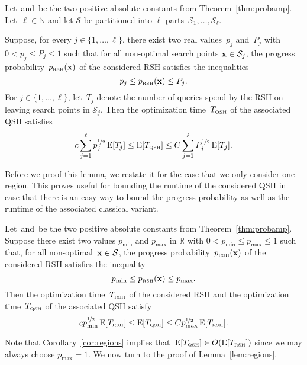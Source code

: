 \documentclass[a4paper,11pt]{article}
\begin{document}
\begin{lemma}
\label{lem:regions}
Let~\lb and~\ub be the two positive absolute constants from Theorem~\ref{thm:probamp}. Let~$\ell\in\mathbb{N}$ and let $\mathcal{S}$ be partitioned into $\ell$ parts~$\mathcal{S}_1, \dots, \mathcal{S}_\ell$.

Suppose, for every $j\in\{1,\dots,\ell\}$, there exist two real values~$p_j$ and~$P_j$ with $0<p_j\le P_j\le 1$ such that for all non-optimal search points $\xvec\in\mathcal{S}_j$, the progress probability~$p_\RSH(\xvec)$ of the considered RSH satisfies the inequalities
\[
p_j\le p_\RSH(\xvec)\le P_j.
\]
For $j\in\{1,\dots,\ell\}$, let~$T_j$ denote the number of queries spend by the RSH on leaving search points in $\mathcal{S}_j$. Then the optimization time~$T_{\text{\tiny\rm QSH}}$ of the associated QSH satisfies
\[
c\sum_{j=1}^\ell p_j^{\nicefrac{1}{2}}\operatorname{E}[T_j]\le \operatorname{E}[T_{\text{\tiny\rm QSH}}] \le C\sum_{j=1}^\ell P_j^{\nicefrac{1}{2}}\operatorname{E}[T_j].
\]
\end{lemma}

Before we proof this lemma, we restate it for the case that we only consider one region. This proves useful for bounding the runtime of the considered QSH in case that there is an easy way to bound the progress probability as well as the runtime of the associated classical variant.

\begin{corollary}
\label{cor:regions}
Let~\lb and~\ub be the two positive absolute constants from Theorem~\ref{thm:probamp}. Suppose there exist two values $p_{\min}$ and $p_{\max}$ in $\mathbb{R}$ with $0<p_{\min}\le p_{\max}\le 1$ such that, for all non-optimal~$\xvec\in\mathcal{S}$, the progress probability~$p_\RSH(\xvec)$ of the considered RSH satisfies the inequality
\[
p_{\min}\le p_\RSH(\xvec)\le p_{\max}. 
\]
Then the optimization time~$T_{\text{\tiny\rm RSH}}$ of the considered RSH and the optimization time~$T_{\text{\tiny\rm QSH}}$ of the associated QSH satisfy
\[
c p_{\min}^{\nicefrac{1}{2}}\operatorname{E}[T_{\text{\tiny\rm RSH}}]\le \operatorname{E}[T_{\text{\tiny\rm QSH}}] \le C p_{\max}^{\nicefrac{1}{2}}\operatorname{E}[T_{\text{\tiny\rm RSH}}].
\]
\end{corollary}

Note that Corollary~\ref{cor:regions} implies that~$\operatorname{E}[T_{\text{\tiny\rm QSH}}]\in{O}(\operatorname{E}[T_{\text{\tiny\rm RSH}}])$ since we may always choose $p_{\max}=1$. We now turn to the proof of Lemma~\ref{lem:regions}.
\end{document}

